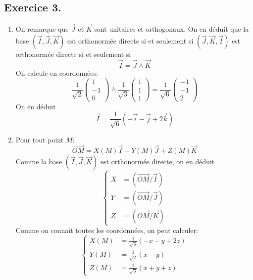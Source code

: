 \subsection*{Exercice 3.}
\begin{enumerate}
 \item On remarque que $\overrightarrow J$ et  $\overrightarrow K$ sont unitaires et orthogonaux. On en déduit que la base $(\overrightarrow I, \overrightarrow J, \overrightarrow K)$ est orthonormée directe si et seulement si $(\overrightarrow J, \overrightarrow K , \overrightarrow I)$ est orthonormée directe si et seulement si 
\begin{displaymath}
 \overrightarrow I = \overrightarrow J \wedge \overrightarrow K
\end{displaymath}
On calcule en coordonnées:
\begin{displaymath}
\frac{1}{\sqrt{2}}
\begin{pmatrix}
 1\\-1\\0
\end{pmatrix}
 \wedge
\frac{1}{\sqrt{3}}
\begin{pmatrix}
 1 \\1\\1
\end{pmatrix}
=
\frac{1}{\sqrt{6}}
\begin{pmatrix}
 -1 \\ -1 \\ 2
\end{pmatrix}
\end{displaymath}
On en déduit
\begin{displaymath}
 \overrightarrow I =
\frac{1}{\sqrt{6}}
\left( 
-\overrightarrow i - \overrightarrow j + 2\overrightarrow k
\right) 
\end{displaymath}
\item Pour tout point $M$:
\begin{displaymath}
 \overrightarrow{OM}=X(M)\overrightarrow I + Y(M)\overrightarrow J + Z(M)\overrightarrow K 
\end{displaymath}
Comme la base $(\overrightarrow I, \overrightarrow J, \overrightarrow K)$ est orthonormée directe, on en déduit
\begin{displaymath}
 \left\lbrace 
\begin{aligned}
 X &= (\overrightarrow{OM}/\overrightarrow I)\\
 Y &= (\overrightarrow{OM}/\overrightarrow J)\\
 Z &= (\overrightarrow{OM}/\overrightarrow K)
\end{aligned}
\right. 
\end{displaymath}
Comme on connait toutes les coordonnées, on peut calculer:
\begin{displaymath}
 \left\lbrace 
\begin{aligned}
 X(M) &= \frac{1}{\sqrt{6}}(-x-y+2z)\\
 Y(M) &= \frac{1}{\sqrt{2}}(x-y)\\
 Z(M) &= \frac{1}{\sqrt{3}}(x+y+z)
\end{aligned}
\right. 
\end{displaymath}


\end{enumerate}
